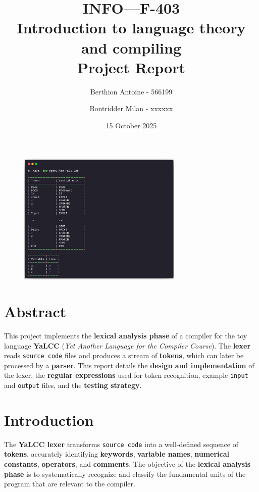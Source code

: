 \documentclass{article}
\title{\textbf{INFO—F-403} \\
Introduction to language theory and compiling \\ 
Project Report}
\author{Berthion Antoine - 566199 \and Bontridder Milan - xxxxxx}
\date{15 October 2025}
\begin{document}
\maketitle

\vspace{-2em}

\begin{figure}[H]
    \centering
    \includegraphics[width=0.7\textwidth]{src/intro.png}
    \label{fig:intro}
\end{figure}

\vspace{-1em}

\section*{Abstract}

This project implements the \textbf{lexical analysis phase} of a compiler for the toy language \textbf{YaLCC} (\textit{Yet Another Language for the Compiler Course}). The \textbf{lexer} reads \texttt{source code} files and produces a stream of \textbf{tokens}, which can later be processed by a \textbf{parser}. This report details the \textbf{design and implementation} of the lexer, the \textbf{regular expressions} used for token recognition, example \texttt{input} and \texttt{output} files, and the \textbf{testing strategy}.


\section{Introduction}

\noindent The \textbf{YaLCC lexer} transforms \texttt{source code} into a well-defined sequence of \textbf{tokens}, accurately identifying \textbf{keywords}, \textbf{variable names}, \textbf{numerical constants}, \textbf{operators}, and \textbf{comments}. The objective of the \textbf{lexical analysis phase} is to systematically recognize and classify the fundamental units of the program that are relevant to the compiler. \\
\end{document}
